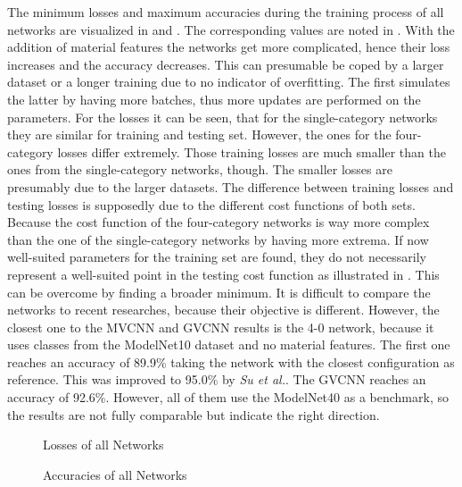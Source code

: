The minimum losses and maximum accuracies during the training process of all networks are visualized in  and .
The corresponding values are noted in .
With the addition of material features the networks get more complicated, hence their loss increases and the accuracy decreases.
This can presumable be coped by a larger dataset or a longer training due to no indicator of overfitting.
The first simulates the latter by having more batches, thus more updates are performed on the parameters.
For the losses it can be seen, that for the single-category networks they are similar for training and testing set.
However, the ones for the four-category losses differ extremely.
Those training losses are much smaller than the ones from the single-category networks, though.
The smaller losses are presumably due to the larger datasets.
The difference between training losses and testing losses is supposedly due to the different cost functions of both sets.
Because the cost function of the four-category networks is way more complex than the one of the single-category networks by having more extrema.
If now well-suited parameters for the training set are found, they do not necessarily represent a well-suited point in the testing cost function as illustrated in .
This can be overcome by finding a broader minimum.
It is difficult to compare the networks to recent researches, because their objective is different.
However, the closest one to the MVCNN and GVCNN results is the 4-0 network, because it uses classes from the ModelNet10 dataset and no material features.
The first one reaches an accuracy of 89.9\% taking the network with the closest configuration as reference.
This was improved to 95.0\% by \textit{Su et al.}.
The GVCNN reaches an accuracy of 92.6\%.
However, all of them use the ModelNet40 as a benchmark, so the results are not fully comparable but indicate the right direction.
\begin{figure}
	\setlength{}
	\setlength{}
	\centering
	
	\caption{Losses of all Networks}
	\label{fig:losses}
\end{figure}
\begin{figure}
	\setlength{}
	\setlength{}
	\centering
	
	\caption{Accuracies of all Networks}
	\label{fig:accuracies}
\end{figure}
